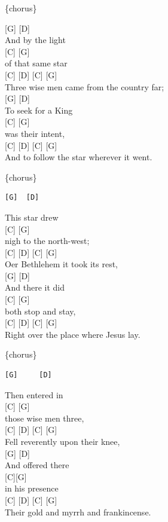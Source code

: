 \documentclass[
  letterpaper,
]{scrbook}
\begin{document}
\{chorus\}

{[}G{]} {[}D{]}\\
And by the light\\
{[}C{]} {[}G{]}\\
of that same star\\
{[}C{]} {[}D{]} {[}C{]} {[}G{]}\\
Three wise men came from the country far;\\
{[}G{]} {[}D{]}\\
To seek for a King\\
{[}C{]} {[}G{]}\\
was their intent,\\
{[}C{]} {[}D{]} {[}C{]} {[}G{]}\\
And to follow the star wherever it went.

\{chorus\}

\begin{verbatim}
[G]  [D] 
\end{verbatim}

This star drew\\
{[}C{]} {[}G{]}\\
nigh to the north-west;\\
{[}C{]} {[}D{]} {[}C{]} {[}G{]}\\
O\textquotesingle er Bethlehem it took it\textquotesingle s rest,\\
{[}G{]} {[}D{]}\\
And there it did\\
{[}C{]} {[}G{]}\\
both stop and stay,\\
{[}C{]} {[}D{]} {[}C{]} {[}G{]}\\
Right over the place where Jesus lay.

\{chorus\}

\begin{verbatim}
[G]     [D] 
\end{verbatim}

Then entered in\\
{[}C{]} {[}G{]}\\
those wise men three,\\
{[}C{]} {[}D{]} {[}C{]} {[}G{]}\\
Fell reverently upon their knee,\\
{[}G{]} {[}D{]}\\
And offered there\\
{[}C{]}{[}G{]}\\
in his presence\\
{[}C{]} {[}D{]} {[}C{]} {[}G{]}\\
Their gold and myrrh and frankincense.
\end{document}
